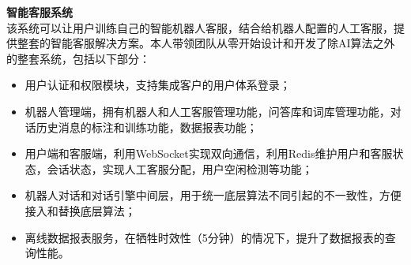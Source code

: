 \documentclass[a4paper]{article}
\newenvironment{changemargin}[2]{%
  \begin{list}{}{%
    \setlength{\topsep}{0pt}%
    \setlength{\leftmargin}{#1}%
    \setlength{\rightmargin}{#2}%
    \setlength{\listparindent}{\parindent}%
    \setlength{\itemindent}{\parindent}%
    \setlength{\parsep}{\parskip}%
  }%
  \item[]}{\end{list}
}
\newenvironment{body} {
	\vspace*{-16pt}
	\begin{changemargin}{-0.5in}{-0.5in}
  }	
	{\end{changemargin}
}
\begin{document}
\begin{body}
 	\vspace{14pt}
  	\textbf{智能客服系统} \\
  	\smallskip
	该系统可以让用户训练自己的智能机器人客服，结合给机器人配置的人工客服，提供整套的智能客服解决方案。本人带领团队从零开始设计和开发了除AI算法之外的整套系统，包括以下部分：
	\vspace*{-2pt}
	\begin{itemize} \itemsep -0pt  %
		\item 用户认证和权限模块，支持集成客户的用户体系登录；\\
	\end{itemize}
	\vspace*{-10pt}
	\begin{itemize} \itemsep -0pt  %
		\item 机器人管理端，拥有机器人和人工客服管理功能，问答库和词库管理功能，对话历史消息的标注和训练功能，数据报表功能；\\
	\end{itemize}
	\vspace*{-10pt}
	\begin{itemize} \itemsep -0pt  %
		\item 用户端和客服端，利用WebSocket实现双向通信，利用Redis维护用户和客服状态，会话状态，实现人工客服分配，用户空闲检测等功能；\\
	\end{itemize}
	\vspace*{-10pt}
	\begin{itemize} \itemsep -0pt  %
		\item 机器人对话和对话引擎中间层，用于统一底层算法不同引起的不一致性，方便接入和替换底层算法；\\
	\end{itemize}
	\vspace*{-10pt}
	\begin{itemize} \itemsep -0pt  %
		\item 离线数据报表服务，在牺牲时效性（5分钟）的情况下，提升了数据报表的查询性能。\\
	\end{itemize}


\end{body}
\end{document}

